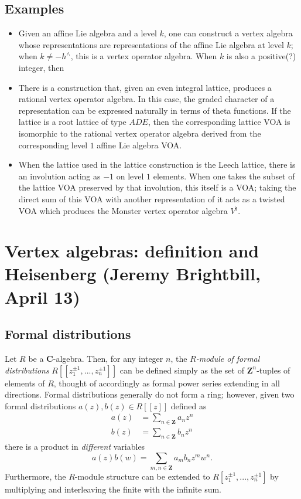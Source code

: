 \documentclass{article}
\newcommand{\CC}{\mathbold{C}}
\newcommand{\ZZ}{\mathbold{Z}}
\begin{document}
\subsection{Examples}
\begin{itemize}
\item Given an affine Lie algebra and a level $k$, one can construct a vertex algebra whose representations are representations of the affine Lie algebra at level $k$; when $k \ne - h^\wedge$, this is a vertex operator algebra.  When $k$ is also a positive(?) integer, then 
\item There is a construction that, given an even integral lattice, produces a rational vertex operator algebra.  In this case, the graded character of a representation can be expressed naturally in terms of theta functions.  If the lattice is a root lattice of type $ADE$, then the corresponding lattice VOA is isomorphic to the rational vertex operator algebra derived from the corresponding level $1$ affine Lie algebra VOA.
\item When the lattice used in the lattice construction is the Leech lattice, there is an involution acting as $-1$ on level $1$ elements.  When one takes the subset of the lattice VOA preserved by that involution, this itself is a VOA; taking the direct sum of this VOA with another representation of it acts as a twisted VOA which produces the Monster vertex operator algebra $V^\natural$.
\end{itemize}

\section{Vertex algebras: definition and Heisenberg (Jeremy Brightbill, April 13)}
\label{sec:defheis}

\subsection{Formal distributions}
Let $R$ be a $\CC$-algebra.  Then, for any integer $n$, the \textit{$R$-module of formal distributions} $R[[z_1^{\pm 1},...,z_n^{\pm 1}]]$ can be defined simply as the set of $\ZZ^n$-tuples of elements of $R$, thought of accordingly as formal power series extending in all directions.  Formal distributions generally do not form a ring; however, given two formal distributions $a(z),b(z) \in R[[z]]$ defined as
\begin{align*}
  a(z)&=\sum_{n \in \ZZ}a_nz^n\\
  b(z)&=\sum_{n \in \ZZ}b_nz^n
\end{align*}
there is a product in \textit{different} variables
\[a(z)b(w) = \sum_{m,n \in \ZZ}a_mb_nz^mw^n. \]
Furthermore, the $R$-module structure can be extended to $R[z_1^{\pm 1},...,z_n^{\pm 1}]$ by multiplying and interleaving the finite with the infinite sum.
\end{document}
